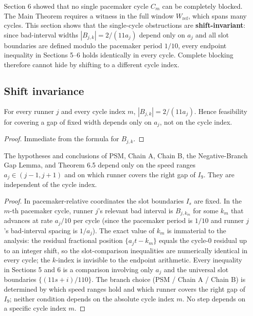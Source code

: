 \documentclass[12pt]{article}
\begin{document}
Section 6 showed that no single pacemaker cycle $C_m$ can be completely blocked.
The Main Theorem requires a witness in the full window $W_{\mathrm{ref}}$, which spans
many cycles. This section shows that the single-cycle obstructions are
\textbf{shift-invariant}: since bad-interval widths $|B_{j,k}|=2/(11a_j)$ depend only on
$a_j$ and all slot boundaries are defined modulo the pacemaker period $1/10$, every
endpoint inequality in Sections 5--6 holds identically in every cycle. Complete blocking
therefore cannot hide by shifting to a different cycle index.

\subsection{Shift invariance}

\begin{lemma}\label{l:71}
For every runner $j$ and every cycle index $m$, $|B_{j,k}|=2/(11a_j)$.
Hence feasibility for covering a gap of fixed width depends only on $a_j$, not on the
cycle index.

\end{lemma}
\begin{proof}
Immediate from the formula for $B_{j,k}$.
\end{proof}

\begin{lemma}\label{l:72}
The hypotheses and conclusions of PSM, Chain A, Chain B, the
Negative-Branch Gap Lemma, and Theorem 6.5 depend only on the speed ranges
$a_j\in(j-1,j+1)$ and on which runner covers the right gap of $I_9$. They are independent
of the cycle index.

\end{lemma}
\begin{proof}
In pacemaker-relative coordinates the slot boundaries $I_s$ are fixed. In the $m$-th pacemaker cycle, runner $j$'s relevant bad interval is $B_{j,k_m}$
for some $k_m$ that advances at rate $a_j/10$ per cycle (since the pacemaker period
is $1/10$ and runner $j$'s bad-interval spacing is $1/a_j$). The exact value of
$k_m$ is immaterial to the analysis: the residual fractional position $\{a_jt - k_m\}$
equals the cycle-0 residual up to an integer shift, so the slot-comparison inequalities
are numerically identical in every cycle; the $k$-index is invisible to the endpoint
arithmetic. Every inequality in Sections 5
and 6 is a comparison involving only $a_j$ and the universal slot boundaries
$\{(11s+i)/110\}$. The branch choice (PSM / Chain A / Chain B) is determined by which
speed ranges hold and which runner covers the right gap of $I_9$; neither condition depends
on the absolute cycle index $m$. No step depends on a specific cycle index $m$.
\end{proof}
\end{document}

